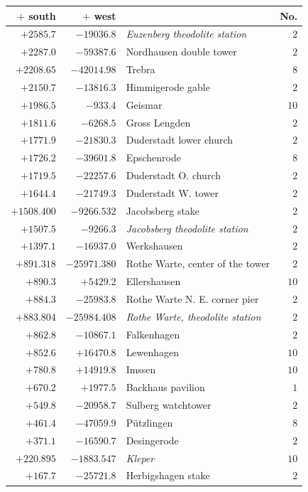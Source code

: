 \begin{center}\begingroup\fontsize{8}{9}\selectfont
\setlength{\tabcolsep}{4pt}
\begin{tabular}{r|r|p{170pt}|r}\hline
\(+\) south&\(+\) west&&No.\\\hline
\(+2585.7\)&\(-19036.8\)&\textit{Euzenberg theodolite station}&\(2\)\\
\(+2287.0\)&\(-59387.6\)&Nordhausen double tower&\(2\)\\
\(+2208.65\)&\(-42014.98\)&Trebra&\(8\)\\
\(+2150.7\)&\(-13816.3\)&Himmigerode gable&\(2\)\\
\(+1986.5\)&\(-933.4\)&Geismar&\(10\)\\
\(+1811.6\)&\(-6268.5\)&Gross Lengden&\(2\)\\
\(+1771.9\)&\(-21830.3\)&Duderstadt lower church&\(2\)\\
\(+1726.2\)&\(-39601.8\)&Epschenrode&\(8\)\\
\(+1719.5\)&\(-22257.6\)&Duderstadt O. church&\(2\)\\
\(+1644.4\)&\(-21749.3\)&Duderstadt W. tower&\(2\)\\
\(+1508.400\)&\(-9266.532\)&Jacobsberg stake&\(2\)\\
\(+1507.5\)&\(-9266.3\)&\textit{Jacobsberg theodolite station}&\(2\)\\
\(+1397.1\)&\(-16937.0\)&Werkshausen&\(2\)\\
\(+891.318\)&\(-25971.380\)&Rothe Warte, center of the tower&\(2\)\\
\(+890.3\)&\(+5429.2\)&Ellershausen&\(10\)\\
\(+884.3\)&\(-25983.8\)&Rothe Warte N. E. corner pier&\(2\)\\
\(+883.804\)&\(-25984.408\)&\textit{Rothe Warte, theodolite station}&\(2\)\\
\(+862.8\)&\(-10867.1\)&Falkenhagen&\(2\)\\
\(+852.6\)&\(+16470.8\)&Lewenhagen&\(10\)\\
\(+780.8\)&\(+14919.8\)&Imssen&\(10\)\\
\(+670.2\)&\(+1977.5\)&Backhaus pavilion&\(1\)\\
\(+549.8\)&\(-20958.7\)&Sulberg watchtower&\(2\)\\
\(+461.4\)&\(-47059.9\)&Pützlingen&\(8\)\\
\(+371.1\)&\(-16590.7\)&Desingerode&\(2\)\\
\(+220.895\)&\(-1883.547\)&\textit{Kleper}&\(10\)\\
\(+167.7\)&\(-25721.8\)&Herbigshagen stake&\(2\)\\

\end{tabular}
\end{center}
